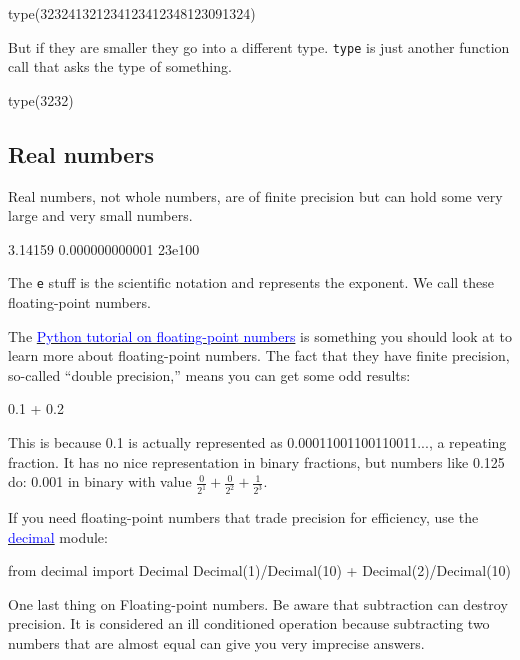 \documentclass[titlepage]{tufte-book}
\begin{document}
\begin{fullwidth}
\begin{pyconsole}[a]
type(323241321234123412348123091324)
\end{pyconsole}

But if they are smaller they go into a different type. {\tt type} is just another function call that asks the type of something.

\begin{pyconsole}[b]
type(3232)
\end{pyconsole}

\subsection{Real numbers}
 
Real numbers, not whole numbers, are of finite precision but can hold some very large and very small numbers.

\begin{pyconsole}[c]
3.14159
0.000000000001
23e100
\end{pyconsole}

The {\tt e} stuff is the scientific notation and represents the exponent. We call these floating-point numbers.

The \href{https://docs.python.org/2/tutorial/floatingpoint.html}{\textcolor{blue}{Python tutorial on floating-point numbers}} is something you should look at to learn more about floating-point numbers. The fact that they have finite precision, so-called ``double precision,'' means you can get some odd results:

\begin{pyconsole}[z]
0.1 + 0.2
\end{pyconsole}

\noindent This is because 0.1 is actually represented as 0.00011001100110011..., a repeating fraction.  It has no nice representation in binary fractions, but numbers like 0.125 do: 0.001 in binary with value $\frac{0}{2^1}+\frac{0}{2^2}+\frac{1}{2^3}$.

If you need floating-point numbers that trade precision for efficiency, use the \href{https://docs.python.org/2/library/decimal.html#module-decimal}{\textcolor{blue}{decimal}} module:

\begin{pyconsole}[z2]
from decimal import Decimal
Decimal(1)/Decimal(10) + Decimal(2)/Decimal(10)
\end{pyconsole}

One last thing on Floating-point numbers. Be aware that subtraction can destroy precision. It is considered an ill conditioned operation because subtracting two numbers that are almost equal can give you very imprecise answers.


\end{fullwidth}
\end{document}
